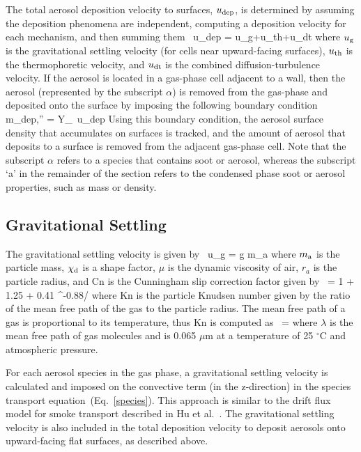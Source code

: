 The total aerosol deposition velocity to surfaces, $u_{\rm dep}$, is determined by assuming the deposition phenomena are independent, computing a deposition velocity for each mechanism, and then summing them~\cite{Bixler:1}
\be
u_{\rm dep} = u_{\rm g}+u_{\rm th}+u_{\rm dt}
\ee
where $u_{\rm g}$ is the gravitational settling velocity (for cells near upward-facing surfaces), $u_{\rm th}$ is the thermophoretic velocity, and $u_{\rm dt}$ is the combined diffusion-turbulence velocity. If the aerosol is located in a gas-phase cell adjacent to a wall, then the aerosol (represented by the subscript $\alpha$) is removed from the gas-phase and deposited onto the surface by imposing the following boundary condition
\be
\dot m_{\rm dep,\alpha}'' = \rho Y_\alpha \, u_{\rm dep}
\ee
Using this boundary condition, the aerosol surface density that accumulates on surfaces is tracked, and the amount
of aerosol that deposits to a surface is removed from the adjacent gas-phase cell.
Note that the subscript $\alpha$ refers to a species that contains soot or aerosol, whereas the subscript `a'
in the remainder of the section refers to the condensed phase soot or aerosol properties, such as mass or density.

\subsection{Gravitational Settling}

The gravitational settling velocity is given by~\cite{Davies_Charles}
\be
u_{\rm g} = g m_{\rm a} 
\ee
where $m_{\rm a}$ is the particle mass, $\chi_{\rm d}$ is a shape factor, $\mu$ is the dynamic viscosity of air,
$r_a$ is the particle radius, and Cn is the Cunningham slip correction factor given by~\cite{Cunningham:1}
\be
{} = 1 + 1.25 \;  + 0.41 \;  \; ^{-0.88/}
\ee
where Kn is the particle Knudsen number given by the ratio of the mean free path of the gas
to the particle radius. The mean free path of a gas is proportional to its temperature,
thus Kn is computed as~\cite{Sippola:1}
\be
{} =  
\ee
where $\lambda$ is the mean free path of gas molecules and is 0.065 $\mu$m at a temperature of 25 $^\circ$C and atmospheric pressure.

For each aerosol species in the gas phase, a gravitational settling velocity is calculated
and imposed on the convective term (in the z-direction) in the species transport
equation~(Eq.~\ref{species}). This approach is similar to the drift flux model
for smoke transport described in Hu et al.~\cite{Hu:1}. The gravitational settling velocity
is also included in the total deposition velocity to deposit aerosols onto upward-facing flat surfaces,
as described above.


